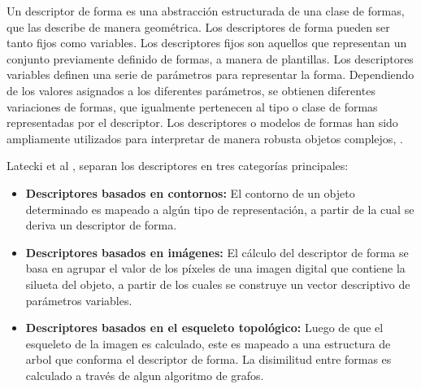 Un descriptor de forma es una abstracci\'on estructurada 
de una clase de formas, que las describe de manera 
geom\'etrica. Los descriptores de forma pueden ser tanto
fijos como variables. Los descriptores fijos son aquellos
que representan un conjunto previamente definido de formas, 
a manera de plantillas. Los descriptores variables definen
una serie de par\'ametros para representar la forma. Dependiendo
de los valores asignados a los diferentes par\'ametros, se obtienen
diferentes variaciones de formas, que igualmente pertenecen al tipo
o clase de formas representadas por el descriptor. 
Los descriptores o modelos de formas han sido ampliamente utilizados para
interpretar de manera robusta objetos complejos, \cite{wormparam}. 

Latecki et al \cite{shapenonrigid}, separan los descriptores en tres
categor\'ias principales:

\begin{itemize}
\item \textbf{Descriptores basados en contornos: } El contorno de un
objeto determinado es mapeado a alg\'un tipo de representaci\'on, a partir de la cual
se deriva un descriptor de forma.
\item \textbf{Descriptores basados en im\'agenes: } El c\'alculo del descriptor
de forma se basa en agrupar el valor de los p\'ixeles de una imagen digital
que contiene la silueta del objeto, a partir de los cuales se construye un vector
descriptivo de par\'ametros variables.
\item \textbf{Descriptores basados en el esqueleto topol\'ogico: } Luego de que
el esqueleto de la imagen es calculado, este es mapeado a una estructura 
de arbol que conforma el descriptor de forma. La disimilitud entre formas
es calculado a trav\'es de algun algoritmo de grafos.
\end{itemize}

